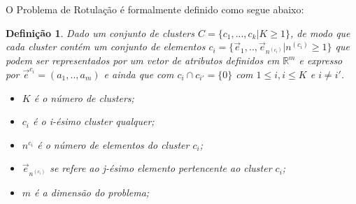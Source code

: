 O Problema de Rotulação é formalmente definido como segue abaixo:
\newtheorem{defprob}{Definição}
    \begin{defprob}
    Dado um conjunto de clusters ${C=\{c_1,...,c_k | K \geqslant 1\} }$, de modo que cada cluster contém um conjunto de elementos ${c_i=\{\vec{e}_1,..,\vec{e}_{n^{(c_i)}}|n^{(c_i)} \geqslant 1 \}}$ que podem ser representados por um vetor de atributos definidos em ${\mathbb{R}^m }$ e expresso por ${ \vec{e}^{c_i}=(a_1,..,a_m)  }$ e ainda que  com ${ c_i \cap c_{i'}=\{0\} }$ com ${ 1 \leqslant i, i \leqslant K  }$ e ${ i \neq i' }$.
        \footnotemark 
        \begin{itemize}[noitemsep]
            \item ${K}$ é o número de clusters;
            \item ${c_i}$ é o i-ésimo cluster qualquer;
            \item ${n^{c_i}}$ é o número de elementos do cluster ${c_i}$;
            \item ${\vec{e}_{n^{(c_i)}}}$ se refere ao j-ésimo elemento pertencente ao cluster ${c_i}$;
            \item ${m}$ é a dimensão do problema;
        \end{itemize}
    \label{teo:problema}
    \end{defprob}




